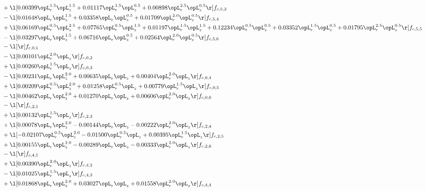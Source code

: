 \begin{alignat}{2}
& + \l[  0.00399 \opL_r^{1.5} \opL_z^{1.5} +  0.01117 \opL_r^{1.5} \opL_z^{0.5} +  0.00898 \opL_r^{2.5} \opL_z^{0.5}  \r] f_{c,5,3} \nonumber \\ 
& - \l[  0.01648 \opL_r \opL_z^{1.5} +  0.03358 \opL_r \opL_z^{0.5} +  0.01709 \opL_r^{2.0} \opL_z^{0.5}  \r] f_{c,5,4} \nonumber \\ 
& + \l[  0.06169 \opL_r^{0.5} \opL_z^{2.5} +  0.07765 \opL_r^{0.5} \opL_z^{1.5} +  0.01197 \opL_r^{1.5} \opL_z^{1.5} +  0.12234 \opL_r^{0.5} \opL_z^{0.5} +  0.03352 \opL_r^{1.5} \opL_z^{0.5} +  0.01795 \opL_r^{2.5} \opL_z^{0.5}  \r] f_{c,5,5} \nonumber \\ 
& - \l[  0.03297 \opL_r \opL_z^{1.5} +  0.06716 \opL_r \opL_z^{0.5} +  0.02564 \opL_r^{2.0} \opL_z^{0.5}  \r] f_{c,5,6} \nonumber \\ 
& - \l[  \r] f_{c,0,1} \nonumber \\ 
& - \l[  0.00101 \opL_r^{2.0} \opL_z  \r] f_{c,0,2} \nonumber \\ 
& + \l[  0.00260 \opL_r^{1.5} \opL_z  \r] f_{c,0,3} \nonumber \\ 
& - \l[  0.00231 \opL_r \opL_z^{2.0} +  0.00635 \opL_r \opL_z +  0.00404 \opL_r^{2.0} \opL_z  \r] f_{c,0,4} \nonumber \\ 
& + \l[  0.00209 \opL_r^{0.5} \opL_z^{2.0} +  0.01258 \opL_r^{0.5} \opL_z +  0.00779 \opL_r^{1.5} \opL_z  \r] f_{c,0,5} \nonumber \\ 
& - \l[  0.00462 \opL_r \opL_z^{2.0} +  0.01270 \opL_r \opL_z +  0.00606 \opL_r^{2.0} \opL_z  \r] f_{c,0,6} \nonumber \\ 
& - \l[  \r] f_{c,2,1} \nonumber \\ 
& + \l[  0.00132 \opL_r^{1.5} \opL_z  \r] f_{c,2,3} \nonumber \\ 
& + \l[  0.00078 \opL_r \opL_z^{2.0}   -0.00144 \opL_r \opL_z   -0.00222 \opL_r^{2.0} \opL_z  \r] f_{c,2,4} \nonumber \\ 
& + \l[  -0.02107 \opL_r^{0.5} \opL_z^{2.0}   -0.01500 \opL_r^{0.5} \opL_z +  0.00395 \opL_r^{1.5} \opL_z  \r] f_{c,2,5} \nonumber \\ 
& + \l[  0.00155 \opL_r \opL_z^{2.0}   -0.00289 \opL_r \opL_z   -0.00333 \opL_r^{2.0} \opL_z  \r] f_{c,2,6} \nonumber \\ 
& - \l[  \r] f_{c,4,1} \nonumber \\ 
& + \l[  0.00390 \opL_r^{2.0} \opL_z  \r] f_{c,4,2} \nonumber \\ 
& - \l[  0.01025 \opL_r^{1.5} \opL_z  \r] f_{c,4,3} \nonumber \\ 
& + \l[  0.01868 \opL_r \opL_z^{2.0} +  0.03027 \opL_r \opL_z +  0.01558 \opL_r^{2.0} \opL_z  \r] f_{c,4,4} \nonumber \\ 

\end{alignat}
